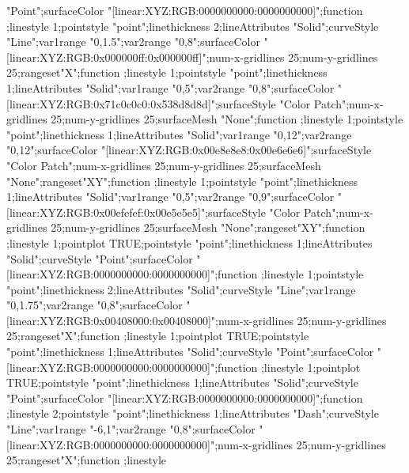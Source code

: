 \documentclass{article}
\begin{document}
{{"Point";surfaceColor "[linear:XYZ:RGB:0000000000:0000000000]";function
;linestyle 1;pointstyle
"point";linethickness 2;lineAttributes "Solid";curveStyle "Line";var1range
"0,1.5";var2range "0,8";surfaceColor
"[linear:XYZ:RGB:0x000000ff:0x000000ff]";num-x-gridlines 25;num-y-gridlines
25;rangeset"X";function ;linestyle
1;pointstyle "point";linethickness 1;lineAttributes "Solid";var1range
"0,5";var2range "0,8";surfaceColor
"[linear:XYZ:RGB:0x71c0c0c0:0x538d8d8d]";surfaceStyle "Color
Patch";num-x-gridlines 25;num-y-gridlines 25;surfaceMesh "None";function
;linestyle 1;pointstyle "point";linethickness
1;lineAttributes "Solid";var1range "0,12";var2range "0,12";surfaceColor
"[linear:XYZ:RGB:0x00e8e8e8:0x00e6e6e6]";surfaceStyle "Color
Patch";num-x-gridlines 25;num-y-gridlines 25;surfaceMesh
"None";rangeset"XY";function ;linestyle
1;pointstyle "point";linethickness 1;lineAttributes "Solid";var1range
"0,5";var2range "0,9";surfaceColor
"[linear:XYZ:RGB:0x00efefef:0x00e5e5e5]";surfaceStyle "Color
Patch";num-x-gridlines 25;num-y-gridlines 25;surfaceMesh
"None";rangeset"XY";function ;linestyle 1;pointplot TRUE;pointstyle
"point";linethickness 1;lineAttributes "Solid";curveStyle
"Point";surfaceColor "[linear:XYZ:RGB:0000000000:0000000000]";function
;linestyle 1;pointstyle "point";linethickness
2;lineAttributes "Solid";curveStyle "Line";var1range "0,1.75";var2range
"0,8";surfaceColor "[linear:XYZ:RGB:0x00408000:0x00408000]";num-x-gridlines
25;num-y-gridlines 25;rangeset"X";function ;linestyle 1;pointplot TRUE;pointstyle "point";linethickness
1;lineAttributes "Solid";curveStyle "Point";surfaceColor
"[linear:XYZ:RGB:0000000000:0000000000]";function ;linestyle 1;pointplot TRUE;pointstyle "point";linethickness
1;lineAttributes "Solid";curveStyle "Point";surfaceColor
"[linear:XYZ:RGB:0000000000:0000000000]";function ;linestyle 2;pointstyle
"point";linethickness 1;lineAttributes "Dash";curveStyle "Line";var1range
"-6,1";var2range "0,8";surfaceColor
"[linear:XYZ:RGB:0000000000:0000000000]";num-x-gridlines 25;num-y-gridlines
25;rangeset"X";function ;linestyle
}}
\end{document}

